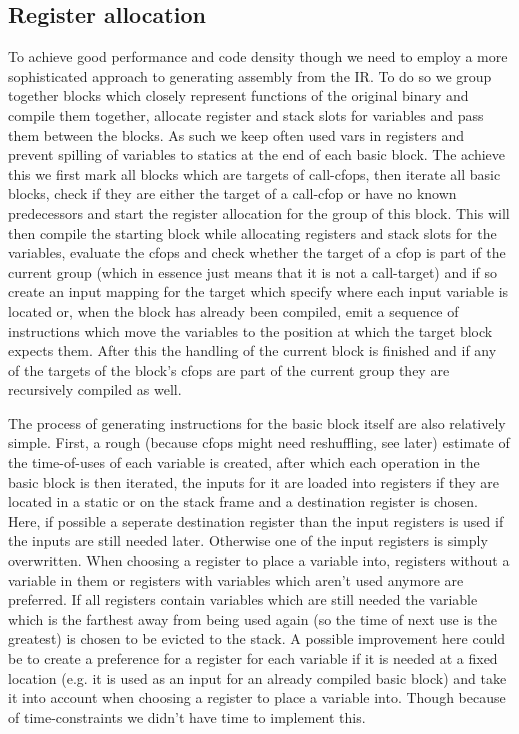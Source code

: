 \documentclass[course=eragp]{aspdoc}
\begin{document}
\subsection{Register allocation}
To achieve good performance and code density though we need to employ a more sophisticated approach to generating assembly from the IR.
To do so we group together blocks which closely represent functions of the original binary and compile them together, allocate register and stack slots
for variables and pass them between the blocks. As such we keep often used vars in registers and prevent spilling of variables to statics at the end of each basic block.
The achieve this we first mark all blocks which are targets of call-cfops, then iterate all basic blocks, check if they are either the target of a call-cfop or have no known predecessors
and start the register allocation for the group of this block.
This will then compile the starting block while allocating registers and stack slots for the variables, evaluate the cfops and check whether the target of a cfop is part of the current group
(which in essence just means that it is not a call-target) and if so create an input mapping for the target which specify where each input variable is located or, when the block has already been compiled,
emit a sequence of instructions which move the variables to the position at which the target block expects them.
After this the handling of the current block is finished and if any of the targets of the block's cfops are part of the current group they are recursively compiled as well.

\par

The process of generating instructions for the basic block itself are also relatively simple. First, a rough (because cfops might need reshuffling, see later) estimate of the time-of-uses of each variable is created,
after which each operation in the basic block is then iterated, the inputs for it are loaded into registers if they are located in a static or on the stack frame and a destination register is chosen.
Here, if possible a seperate destination register than the input registers is used if the inputs are still needed later. Otherwise one of the input registers is simply overwritten.
When choosing a register to place a variable into, registers without a variable in them or registers with variables which aren't used anymore are preferred. If all registers contain variables which are still needed
the variable which is the farthest away from being used again (so the time of next use is the greatest) is chosen to be evicted to the stack.
A possible improvement here could be to create a preference for a register for each variable if it is needed at a fixed location (e.g. it is used as an input for an already compiled basic block)
and take it into account when choosing a register to place a variable into. Though because of time-constraints we didn't have time to implement this.
\end{document}
